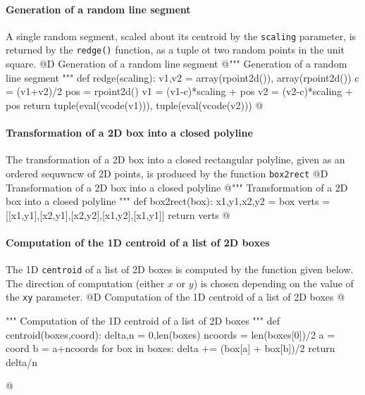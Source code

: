 \documentclass[11pt,oneside]{article}    %
\begin{document}
\paragraph{Generation of a random line segment}
A single random segment, scaled about its centroid by the \texttt{scaling} parameter, is returned by the \texttt{redge()} function, as a tuple ot two random points in the unit square.
@D Generation of a random line segment
@{""" Generation of a random line segment """
def redge(scaling):
    v1,v2 = array(rpoint2d()), array(rpoint2d())
    c = (v1+v2)/2
    pos = rpoint2d()
    v1 = (v1-c)*scaling + pos
    v2 = (v2-c)*scaling + pos
    return tuple(eval(vcode(v1))), tuple(eval(vcode(v2)))
@}
    
\paragraph{Transformation of a 2D box into a closed polyline}
The transformation of a 2D box into a closed rectangular polyline, given as an ordered sequwncw of 2D points, is produced by the function \texttt{box2rect}
@D Transformation of a 2D box into a closed polyline
@{""" Transformation of a 2D box into a closed polyline """    
def box2rect(box):
    x1,y1,x2,y2 = box
    verts = [[x1,y1],[x2,y1],[x2,y2],[x1,y2],[x1,y1]]
    return verts
@}
    
\paragraph{Computation of the 1D centroid of a list of 2D boxes}
The 1D \texttt{centroid} of a list of 2D boxes is computed by the function given below.
The direction of computation (either $x$ or $y$) is chosen depending on the value of the \texttt{xy} parameter. 
@D Computation of the 1D centroid of a list of 2D boxes
@{""" Computation of the 1D centroid of a list of 2D boxes """    
def centroid(boxes,coord):
    delta,n = 0,len(boxes)
    ncoords = len(boxes[0])/2
    a = coord%
    b = a+ncoords
    for box in boxes:
        delta += (box[a] + box[b])/2
    return delta/n

@}
\end{document}
